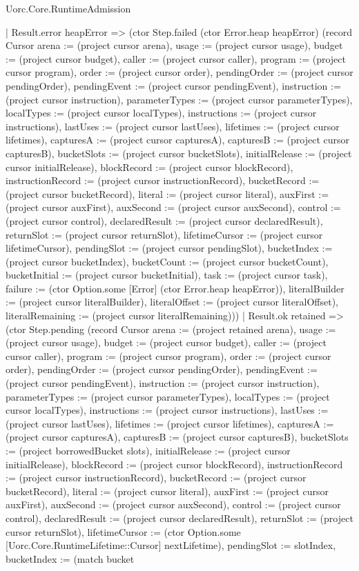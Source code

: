 \begin{lexlean}{Uorc.Core.RuntimeAdmission}
\begin{semanticmodule}
{                | Result.error heapError => (ctor Step.failed (ctor Error.heap heapError) (record Cursor {arena := (project cursor arena), usage := (project cursor usage), budget := (project cursor budget), caller := (project cursor caller), program := (project cursor program), order := (project cursor order), pendingOrder := (project cursor pendingOrder), pendingEvent := (project cursor pendingEvent), instruction := (project cursor instruction), parameterTypes := (project cursor parameterTypes), localTypes := (project cursor localTypes), instructions := (project cursor instructions), lastUses := (project cursor lastUses), lifetimes := (project cursor lifetimes), capturesA := (project cursor capturesA), capturesB := (project cursor capturesB), bucketSlots := (project cursor bucketSlots), initialRelease := (project cursor initialRelease), blockRecord := (project cursor blockRecord), instructionRecord := (project cursor instructionRecord), bucketRecord := (project cursor bucketRecord), literal := (project cursor literal), auxFirst := (project cursor auxFirst), auxSecond := (project cursor auxSecond), control := (project cursor control), declaredResult := (project cursor declaredResult), returnSlot := (project cursor returnSlot), lifetimeCursor := (project cursor lifetimeCursor), pendingSlot := (project cursor pendingSlot), bucketIndex := (project cursor bucketIndex), bucketCount := (project cursor bucketCount), bucketInitial := (project cursor bucketInitial), task := (project cursor task), failure := (ctor Option.some [Error] (ctor Error.heap heapError)), literalBuilder := (project cursor literalBuilder), literalOffset := (project cursor literalOffset), literalRemaining := (project cursor literalRemaining)}))
                | Result.ok retained => (ctor Step.pending (record Cursor {arena := (project retained arena), usage := (project cursor usage), budget := (project cursor budget), caller := (project cursor caller), program := (project cursor program), order := (project cursor order), pendingOrder := (project cursor pendingOrder), pendingEvent := (project cursor pendingEvent), instruction := (project cursor instruction), parameterTypes := (project cursor parameterTypes), localTypes := (project cursor localTypes), instructions := (project cursor instructions), lastUses := (project cursor lastUses), lifetimes := (project cursor lifetimes), capturesA := (project cursor capturesA), capturesB := (project cursor capturesB), bucketSlots := (project borrowedBucket slots), initialRelease := (project cursor initialRelease), blockRecord := (project cursor blockRecord), instructionRecord := (project cursor instructionRecord), bucketRecord := (project cursor bucketRecord), literal := (project cursor literal), auxFirst := (project cursor auxFirst), auxSecond := (project cursor auxSecond), control := (project cursor control), declaredResult := (project cursor declaredResult), returnSlot := (project cursor returnSlot), lifetimeCursor := (ctor Option.some [Uorc.Core.RuntimeLifetime::Cursor] nextLifetime), pendingSlot := slotIndex, bucketIndex := (match bucket
}}
\end{semanticmodule}
\end{lexlean}
